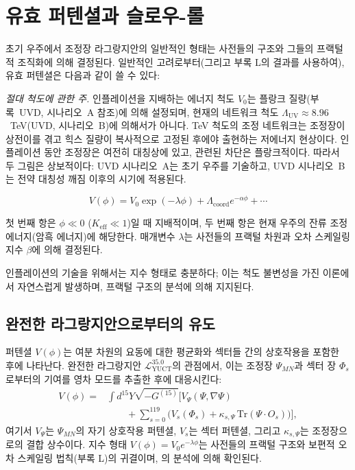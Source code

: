 \documentclass[11pt,a4paper]{article}
\newcommand{\Keff}{K_{\mathrm{eff}}}
\begin{document}
	\section{유효 퍼텐셜과 슬로우-롤}
	\label{sec:potential}
	
	초기 우주에서 조정장 라그랑지안의 일반적인 형태는 사전들의 구조와 그들의 프랙털적 조직화에 의해 결정된다. 일반적인 고려로부터(그리고 부록 L의 결과를 사용하여), 유효 퍼텐셜은 다음과 같이 쓸 수 있다:
	
	\noindent\textit{절대 척도에 관한 주.}
	인플레이션을 지배하는 에너지 척도 \(V_0\)는 플랑크 질량(부록~UVD, 시나리오~A 참조)에 의해 설정되며, 현재의 네트워크 척도 \(\Lambda_{\mathrm{UV}} \approx 8.96\)~TeV(UVD, 시나리오~B)에 의해서가 아니다. TeV 척도의 조정 네트워크는 조정장이 상전이를 겪고 힉스 질량이 복사적으로 고정된 후에야 출현하는 저에너지 현상이다. 인플레이션 동안 조정장은 여전히 대칭상에 있고, 관련된 차단은 플랑크적이다. 따라서 두 그림은 상보적이다: UVD 시나리오~A는 초기 우주를 기술하고, UVD 시나리오~B는 전약 대칭성 깨짐 이후의 시기에 적용된다.
	
	\begin{equation}
		V(\phi) = V_0 \exp\left( -\lambda \phi \right) + \Lambda_{\mathrm{coord}} e^{-\alpha \phi} + \cdots
		\label{eq:potential}
	\end{equation}
	
	첫 번째 항은 \(\phi \ll 0\) (\(\Keff \ll 1\))일 때 지배적이며, 두 번째 항은 현재 우주의 잔류 조정 에너지(암흑 에너지)에 해당한다. 매개변수 \(\lambda\)는 사전들의 프랙털 차원과 오차 스케일링 지수 \(\beta\)에 의해 결정된다.
	
	인플레이션의 기술을 위해서는 지수 형태로 충분하다; 이는 척도 불변성을 가진 이론에서 자연스럽게 발생하며, 프랙털 구조의 분석에 의해 지지된다.
	
	\subsection{완전한 라그랑지안으로부터의 유도}
	
	퍼텐셜 \(V(\phi)\)는 여분 차원의 요동에 대한 평균화와 섹터들 간의 상호작용을 포함한 후에 나타난다. 완전한 라그랑지안 \(\mathcal{L}_{\text{YUCT}}^{35.0}\)의 관점에서, 이는 조정장 \(\Psi_{MN}\)과 섹터 장 \(\Phi_s\)로부터의 기여를 영차 모드를 추출한 후에 대응시킨다:
	\begin{align}
		V(\phi) = &\int d^{15}Y \sqrt{-G^{(15)}} \Big[ V_{\Psi}(\Psi,\nabla\Psi) \nonumber\\
		&\qquad + \sum_{s=0}^{119} \big( V_s(\Phi_s) + \kappa_{s,\Psi}\,\mathrm{Tr}(\Psi\cdot O_s) \big) \Big],
	\end{align}
	여기서 \(V_{\Psi}\)는 \(\Psi_{MN}\)의 자기 상호작용 퍼텐셜, \(V_s\)는 섹터 퍼텐셜, 그리고 \(\kappa_{s,\Psi}\)는 조정장으로의 결합 상수이다. 지수 형태 \(V(\phi)=V_0 e^{-\lambda\phi}\)는 사전들의 프랙털 구조와 보편적 오차 스케일링 법칙(부록 L)의 귀결이며, \cite{Yakushev2026}의 분석에 의해 확인된다.
	
\end{document}
